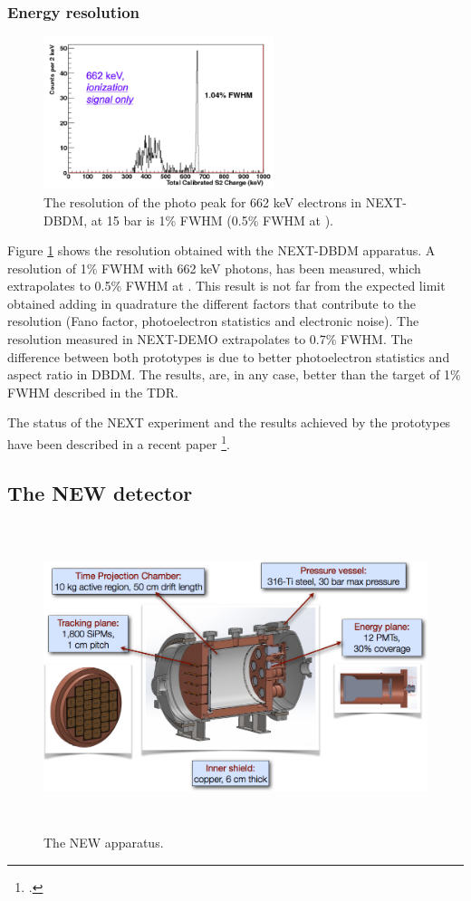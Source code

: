 \documentclass[a4paper,11pt,oneside]{article}
\begin{document}
\subsubsection*{Energy resolution}

\begin{figure}
\centering
\includegraphics[width=0.6\textwidth]{img/Cs660.png}
\caption{\small The resolution of the photo peak for 662 keV electrons in NEXT-DBDM, at 15 bar is 1\% FWHM (0.5\% FWHM at \Qbb).}\label{fig.ERES}
\end{figure}

Figure \ref{fig.ERES} shows the resolution obtained with the NEXT-DBDM apparatus. A resolution of 1\% FWHM with 
662 keV photons, has been measured, which extrapolates to 0.5\% FWHM at \Qbb. This result is not far from the expected limit obtained adding in quadrature the different factors that contribute to the resolution (Fano factor, photoelectron statistics and electronic noise). The resolution measured in NEXT-DEMO extrapolates to 0.7\% FWHM. The difference between both prototypes is due to better photoelectron statistics and aspect ratio in DBDM. The results, are, in any case, better than the target of 1\% FWHM described in the TDR.

The status of the NEXT experiment and the results achieved by the prototypes have been described in a recent
paper \footcite{Gomez-Cadenas:2013lta}.

\subsection*{The NEW detector}
\label{sec.new}

\begin{figure}
\centering
\includegraphics[height=9cm]{img/NEW.png}
\caption{The NEW apparatus.} \label{fig:NEW}
\end{figure} 
\end{document}
